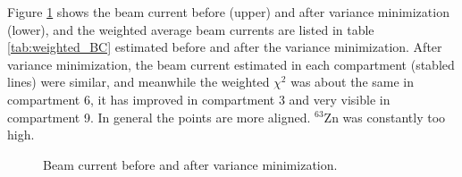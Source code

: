 \noindent
Figure \ref{fig:varmin_beamcurrent} shows the beam current before (upper) and after variance minimization (lower), and the weighted average beam currents are listed in table \ref{tab:weighted_BC} estimated before and after the variance minimization. After variance minimization, the beam current estimated in each compartment (stabled lines) were similar, and meanwhile the weighted $\chi^2$ was about the same in compartment 6, it has improved in compartment 3 and very visible in compartment 9. In general the points are more aligned. $^{63}$Zn was constantly too high. 
\begin{figure}%
    \centering
    \hfill
    \caption{Beam current before and after variance minimization.  }%
    \label{fig:varmin_beamcurrent}%
\end{figure}

